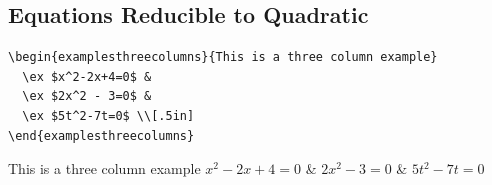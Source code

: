 \subsection*{Equations Reducible to Quadratic}


\begin{verbatim}
\begin{examplesthreecolumns}{This is a three column example}
  \ex $x^2-2x+4=0$ &
  \ex $2x^2 - 3=0$ &
  \ex $5t^2-7t=0$ \\[.5in]
\end{examplesthreecolumns}
\end{verbatim}
\begin{examplesthreecolumns}{This is a three column example}
  \ex $x^2-2x+4=0$ &
  \ex $2x^2 - 3=0$ &
  \ex $5t^2-7t=0$ \\[.5in]
\end{examplesthreecolumns}



